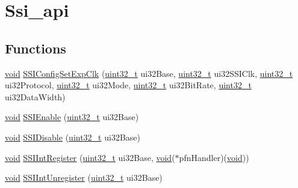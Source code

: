 \hypertarget{group__ssi__api}{}\section{Ssi\+\_\+api}
\label{group__ssi__api}
\subsection*{Functions}
\begin{DoxyCompactItemize}
\item 
\hyperlink{usb__devapi_8h_afabf60e7f57651d6d595a02c75f07cd0}{void} \hyperlink{group__ssi__api_ga920b241b9d99f0b19f1c0a6f3779bc10}{S\+S\+I\+Config\+Set\+Exp\+Clk} (\hyperlink{_p_e___types_8h_a33594304e786b158f3fb30289278f5af}{uint32\+\_\+t} ui32\+Base, \hyperlink{_p_e___types_8h_a33594304e786b158f3fb30289278f5af}{uint32\+\_\+t} ui32\+S\+S\+I\+Clk, \hyperlink{_p_e___types_8h_a33594304e786b158f3fb30289278f5af}{uint32\+\_\+t} ui32\+Protocol, \hyperlink{_p_e___types_8h_a33594304e786b158f3fb30289278f5af}{uint32\+\_\+t} ui32\+Mode, \hyperlink{_p_e___types_8h_a33594304e786b158f3fb30289278f5af}{uint32\+\_\+t} ui32\+Bit\+Rate, \hyperlink{_p_e___types_8h_a33594304e786b158f3fb30289278f5af}{uint32\+\_\+t} ui32\+Data\+Width)
\item 
\hyperlink{usb__devapi_8h_afabf60e7f57651d6d595a02c75f07cd0}{void} \hyperlink{group__ssi__api_gadc0373c0979c964baa2ae5aba2ecfe4a}{S\+S\+I\+Enable} (\hyperlink{_p_e___types_8h_a33594304e786b158f3fb30289278f5af}{uint32\+\_\+t} ui32\+Base)
\item 
\hyperlink{usb__devapi_8h_afabf60e7f57651d6d595a02c75f07cd0}{void} \hyperlink{group__ssi__api_ga71320bfb623b3d5b957e52fdc5d6f869}{S\+S\+I\+Disable} (\hyperlink{_p_e___types_8h_a33594304e786b158f3fb30289278f5af}{uint32\+\_\+t} ui32\+Base)
\item 
\hyperlink{usb__devapi_8h_afabf60e7f57651d6d595a02c75f07cd0}{void} \hyperlink{group__ssi__api_gacdf1425d778fc513d2951759bd3d472b}{S\+S\+I\+Int\+Register} (\hyperlink{_p_e___types_8h_a33594304e786b158f3fb30289278f5af}{uint32\+\_\+t} ui32\+Base, \hyperlink{usb__devapi_8h_afabf60e7f57651d6d595a02c75f07cd0}{void}($\ast$pfn\+Handler)(\hyperlink{usb__devapi_8h_afabf60e7f57651d6d595a02c75f07cd0}{void}))
\item 
\hyperlink{usb__devapi_8h_afabf60e7f57651d6d595a02c75f07cd0}{void} \hyperlink{group__ssi__api_gae682d0e169a70b235a92b11dbeb5daef}{S\+S\+I\+Int\+Unregister} (\hyperlink{_p_e___types_8h_a33594304e786b158f3fb30289278f5af}{uint32\+\_\+t} ui32\+Base)

\end{DoxyCompactItemize}
